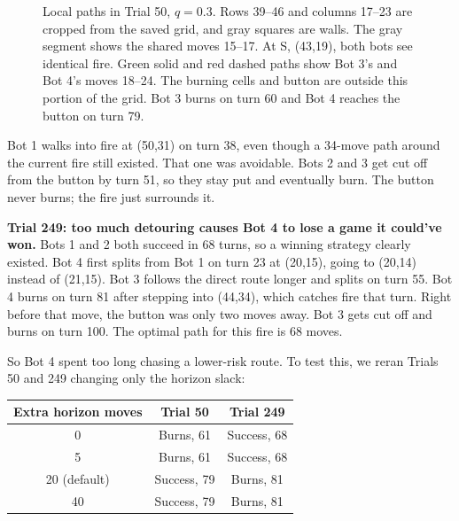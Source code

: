 \documentclass[11pt]{article}
\begin{document}
\begin{figure}[h]
\caption{Local paths in Trial 50, $q = 0.3$. Rows 39--46 and columns 17--23 are cropped from the saved grid, and gray squares are walls. The gray segment shows the shared moves 15--17. At S, (43,19), both bots see identical fire. Green solid and red dashed paths show Bot 3's and Bot 4's moves 18--24. The burning cells and button are outside this portion of the grid. Bot 3 burns on turn 60 and Bot 4 reaches the button on turn 79.}
\label{fig:trial50}
\end{figure}

Bot 1 walks into fire at (50,31) on turn 38, even though a 34-move path around the current fire still existed. That one was avoidable. Bots 2 and 3 get cut off from the button by turn 51, so they stay put and eventually burn. The button never burns; the fire just surrounds it.

\textbf{Trial 249: too much detouring causes Bot 4 to lose a game it could've won.} Bots 1 and 2 both succeed in 68 turns, so a winning strategy clearly existed. Bot 4 first splits from Bot 1 on turn 23 at (20,15), going to (20,14) instead of (21,15). Bot 3 follows the direct route longer and splits on turn 55. Bot 4 burns on turn 81 after stepping into (44,34), which catches fire that turn. Right before that move, the button was only two moves away. Bot 3 gets cut off and burns on turn 100. The optimal path for this fire is 68 moves.

So Bot 4 spent too long chasing a lower-risk route. To test this, we reran Trials 50 and 249 changing only the horizon slack:

\begin{center}
\begin{tabular}{ccc}
\toprule
Extra horizon moves & Trial 50 & Trial 249 \\
\midrule
0 & Burns, 61 & Success, 68 \\
5 & Burns, 61 & Success, 68 \\
20 (default) & Success, 79 & Burns, 81 \\
40 & Success, 79 & Burns, 81 \\
\bottomrule
\end{tabular}
\end{center}
\end{document}
